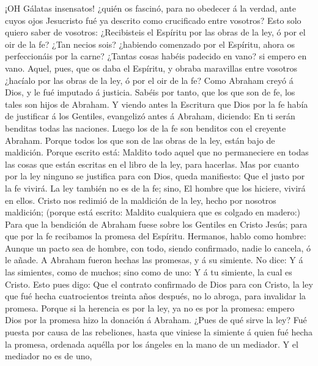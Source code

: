  ¡OH Gálatas insensatos! ¿quién os fascinó, para no obedecer
á la verdad, ante cuyos ojos Jesucristo fué ya descrito como crucificado
entre vosotros?  Esto solo quiero saber de vosotros:
¿Recibisteis el Espíritu por las obras de la ley, ó por el oir de la fe?
 ¿Tan necios sois? ¿habiendo comenzado por el Espíritu,
ahora os perfeccionáis por la carne?  ¿Tantas cosas habéis
padecido en vano? si empero en vano.  Aquel, pues, que os
daba el Espíritu, y obraba maravillas entre vosotros ¿hacíalo por las
obras de la ley, ó por el oir de la fe?  Como Abraham creyó
á Dios, y le fué imputado á justicia.  Sabéis por tanto, que
los que son de fe, los tales son hijos de Abraham.  Y viendo
antes la Escritura que Dios por la fe había de justificar á los
Gentiles, evangelizó antes á Abraham, diciendo: En ti serán benditas
todas las naciones.  Luego los de la fe son benditos con el
creyente Abraham.  Porque todos los que son de las obras de
la ley, están bajo de maldición. Porque escrito está: Maldito todo aquel
que no permaneciere en todas las cosas que están escritas en el libro de
la ley, para hacerlas.  Mas por cuanto por la ley ninguno
se justifica para con Dios, queda manifiesto: Que el justo por la fe
vivirá.  La ley también no es de la fe; sino, El hombre que
los hiciere, vivirá en ellos.  Cristo nos redimió de la
maldición de la ley, hecho por nosotros maldición; (porque está escrito:
Maldito cualquiera que es colgado en madero:)  Para que la
bendición de Abraham fuese sobre los Gentiles en Cristo Jesús; para que
por la fe recibamos la promesa del Espíritu.  Hermanos,
hablo como hombre: Aunque un pacto sea de hombre, con todo, siendo
confirmado, nadie lo cancela, ó le añade.  A Abraham fueron
hechas las promesas, y á su simiente. No dice: Y á las simientes, como
de muchos; sino como de uno: Y á tu simiente, la cual es Cristo.
 Esto pues digo: Que el contrato confirmado de Dios para
con Cristo, la ley que fué hecha cuatrocientos treinta años después, no
lo abroga, para invalidar la promesa.  Porque si la
herencia es por la ley, ya no es por la promesa: empero Dios por la
promesa hizo la donación á Abraham.  ¿Pues de qué sirve la
ley? Fué puesta por causa de las rebeliones, hasta que viniese la
simiente á quien fué hecha la promesa, ordenada aquélla por los ángeles
en la mano de un mediador.  Y el mediador no es de uno,
